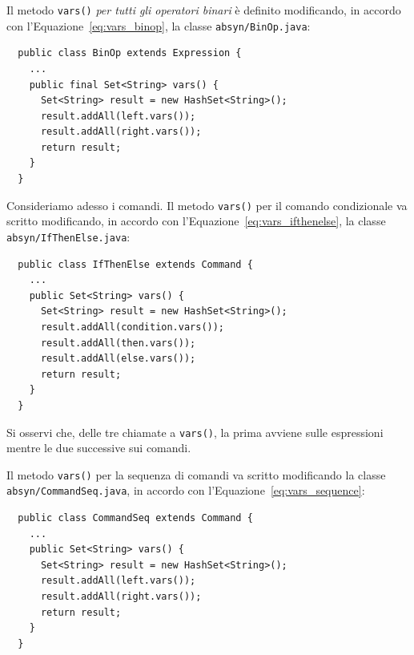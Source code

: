 Il metodo \texttt{vars()}
\emph{per tutti gli operatori binari} \`e definito modificando, in accordo
con l'Equazione~\eqref{eq:vars_binop}, la classe \texttt{absyn/BinOp.java}:
%
\begin{verbatim}
  public class BinOp extends Expression {
    ...
    public final Set<String> vars() {
      Set<String> result = new HashSet<String>();
      result.addAll(left.vars());
      result.addAll(right.vars());
      return result;
    }
  }
\end{verbatim}
%

Consideriamo adesso i comandi. Il metodo \texttt{vars()} per il comando
condizionale va scritto modificando, in accordo con
l'Equazione~\eqref{eq:vars_ifthenelse}, la classe
\texttt{absyn/IfThenElse.java}:
%
\begin{verbatim}
  public class IfThenElse extends Command {
    ...
    public Set<String> vars() {
      Set<String> result = new HashSet<String>();
      result.addAll(condition.vars());
      result.addAll(then.vars());
      result.addAll(else.vars());
      return result;
    }
  }
\end{verbatim}
%
Si osservi che, delle tre chiamate a \texttt{vars()}, la prima avviene
sulle espressioni mentre le due successive sui comandi.

Il metodo \texttt{vars()} per la sequenza di comandi va scritto modificando
la classe \texttt{absyn/CommandSeq.java}, in accordo con l'Equazione~\eqref{eq:vars_sequence}:
%
\begin{verbatim}
  public class CommandSeq extends Command {
    ...
    public Set<String> vars() {
      Set<String> result = new HashSet<String>();
      result.addAll(left.vars());
      result.addAll(right.vars());
      return result;
    }
  }
\end{verbatim}
%
